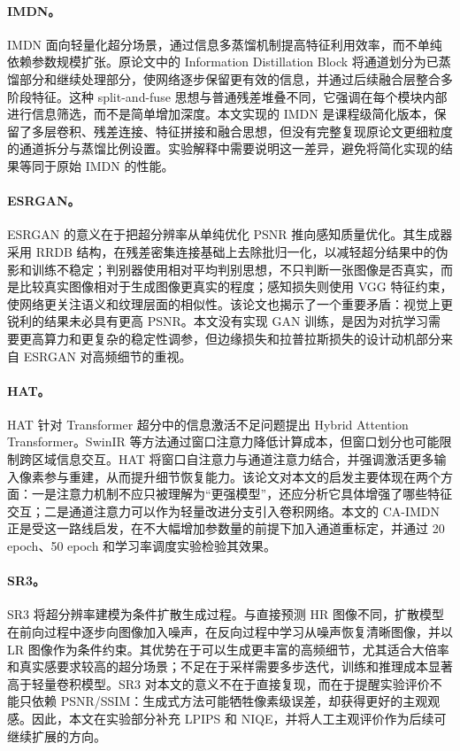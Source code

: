 \documentclass[bwprint]{report}
\begin{document}
\paragraph{IMDN。}
IMDN 面向轻量化超分场景，通过信息多蒸馏机制提高特征利用效率，而不单纯依赖参数规模扩张\cite{hui2019imdn}。原论文中的 Information Distillation Block 将通道划分为已蒸馏部分和继续处理部分，使网络逐步保留更有效的信息，并通过后续融合层整合多阶段特征。这种 split-and-fuse 思想与普通残差堆叠不同，它强调在每个模块内部进行信息筛选，而不是简单增加深度。本文实现的 IMDN 是课程级简化版本，保留了多层卷积、残差连接、特征拼接和融合思想，但没有完整复现原论文更细粒度的通道拆分与蒸馏比例设置。实验解释中需要说明这一差异，避免将简化实现的结果等同于原始 IMDN 的性能。

\paragraph{ESRGAN。}
ESRGAN 的意义在于把超分辨率从单纯优化 PSNR 推向感知质量优化\cite{wang2018esrgan}。其生成器采用 RRDB 结构，在残差密集连接基础上去除批归一化，以减轻超分结果中的伪影和训练不稳定；判别器使用相对平均判别思想，不只判断一张图像是否真实，而是比较真实图像相对于生成图像更真实的程度；感知损失则使用 VGG 特征约束，使网络更关注语义和纹理层面的相似性。该论文也揭示了一个重要矛盾：视觉上更锐利的结果未必具有更高 PSNR。本文没有实现 GAN 训练，是因为对抗学习需要更高算力和更复杂的稳定性调参，但边缘损失和拉普拉斯损失的设计动机部分来自 ESRGAN 对高频细节的重视。

\paragraph{HAT。}
HAT 针对 Transformer 超分中的信息激活不足问题提出 Hybrid Attention Transformer\cite{chen2023hat}。SwinIR 等方法通过窗口注意力降低计算成本，但窗口划分也可能限制跨区域信息交互。HAT 将窗口自注意力与通道注意力结合，并强调激活更多输入像素参与重建，从而提升细节恢复能力。该论文对本文的启发主要体现在两个方面：一是注意力机制不应只被理解为“更强模型”，还应分析它具体增强了哪些特征交互；二是通道注意力可以作为轻量改进分支引入卷积网络。本文的 CA-IMDN 正是受这一路线启发，在不大幅增加参数量的前提下加入通道重标定，并通过 20 epoch、50 epoch 和学习率调度实验检验其效果。

\paragraph{SR3。}
SR3 将超分辨率建模为条件扩散生成过程\cite{saharia2021sr3}。与直接预测 HR 图像不同，扩散模型在前向过程中逐步向图像加入噪声，在反向过程中学习从噪声恢复清晰图像，并以 LR 图像作为条件约束。其优势在于可以生成更丰富的高频细节，尤其适合大倍率和真实感要求较高的超分场景；不足在于采样需要多步迭代，训练和推理成本显著高于轻量卷积模型。SR3 对本文的意义不在于直接复现，而在于提醒实验评价不能只依赖 PSNR/SSIM：生成式方法可能牺牲像素级误差，却获得更好的主观观感。因此，本文在实验部分补充 LPIPS 和 NIQE，并将人工主观评价作为后续可继续扩展的方向。
\end{document}
